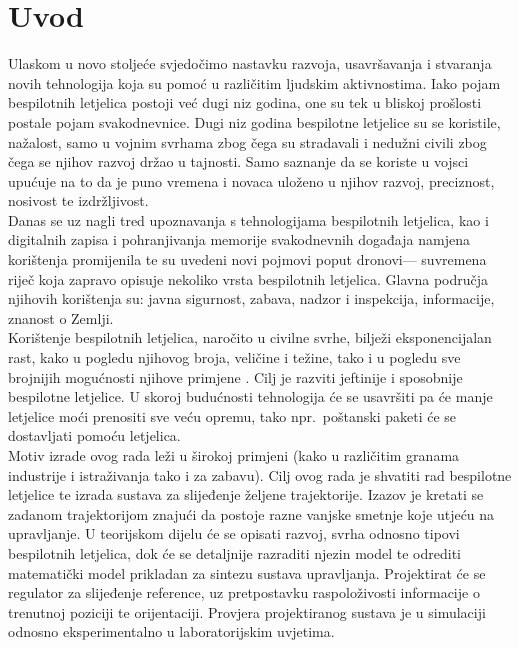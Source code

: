 \documentclass[times, utf8, diplomski]{fer}
\begin{document}
\chapter{Uvod}
Ulaskom u novo stoljeće svjedočimo nastavku razvoja, usavršavanja i stvaranja novih tehnologija koja su pomoć u različitim ljudskim aktivnostima. Iako pojam bespilotnih letjelica postoji već dugi niz godina, one su tek u bliskoj prošlosti postale pojam svakodnevnice. Dugi niz godina bespilotne letjelice su se koristile, nažalost, samo u vojnim svrhama zbog čega su stradavali i nedužni civili zbog čega se njihov razvoj držao u tajnosti. Samo saznanje da se koriste u vojsci upućuje na to da je puno vremena i novaca uloženo u njihov razvoj, preciznost, nosivost te izdržljivost.\\
Danas se uz nagli tred upoznavanja s tehnologijama bespilotnih letjelica, kao i digitalnih zapisa i pohranjivanja memorije svakodnevnih događaja namjena korištenja promijenila te su uvedeni novi pojmovi poput \glqq dronovi\grqq --- suvremena riječ koja zapravo opisuje nekoliko vrsta bespilotnih letjelica. Glavna područja njihovih korištenja su: javna sigurnost, zabava, nadzor i inspekcija, informacije, znanost o Zemlji.\\
Korištenje  bespilotnih letjelica, naročito u civilne svrhe, bilježi eksponencijalan rast, kako u pogledu njihovog broja, veličine i težine, tako i u pogledu sve brojnijih mogućnosti njihove primjene \citep{EUR-Lex}. Cilj je razviti jeftinije i sposobnije bespilotne letjelice. U skoroj budućnosti tehnologija će se usavršiti pa će manje letjelice moći prenositi sve veću opremu, tako npr.~poštanski paketi će se dostavljati pomoću letjelica.\\
Motiv izrade ovog rada leži u širokoj primjeni (kako u različitim granama industrije i istraživanja tako i za zabavu). Cilj ovog rada je shvatiti rad bespilotne letjelice te izrada sustava za slijeđenje željene trajektorije. Izazov je kretati se zadanom trajektorijom znajući da postoje razne vanjske smetnje koje utjeću na upravljanje. U teorijskom dijelu će se opisati razvoj, svrha odnosno tipovi bespilotnih letjelica, dok će se detaljnije razraditi njezin model te odrediti matematički model prikladan za sintezu sustava upravljanja. Projektirat će se regulator za slijeđenje reference, uz pretpostavku raspoloživosti informacije o trenutnoj poziciji te orijentaciji. Provjera projektiranog sustava je u simulaciji odnosno eksperimentalno u laboratorijskim uvjetima.
\end{document}
